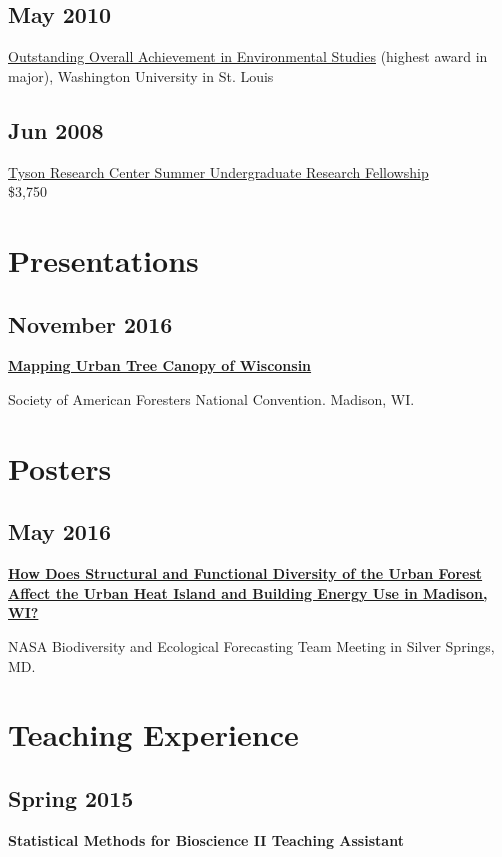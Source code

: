 \documentclass{article}
\begin{document}
\subsection*{May  2010}
\label{sec:orgb18f05c}
\href{http://enst.wustl.edu/program/awards}{Outstanding Overall Achievement in Environmental Studies} (highest
award in major), Washington University in St. Louis

\subsection*{Jun 2008}
\label{sec:org7071e04}
\href{http://tyson.wustl.edu/teaching-ugrad.php}{Tyson Research Center Summer Undergraduate Research Fellowship} \\
 \$3,750

\section*{Presentations}
\label{sec:org1988da5}
\subsection*{November 2016}
\label{sec:org512fd0d}
\textbf{\href{http://pages.stat.wisc.edu/\~erker/Presentations/SAF\_20161105/saf\_presentation.html}{Mapping Urban Tree Canopy of Wisconsin}}

Society of American Foresters National Convention. Madison, WI.
\section*{Posters}
\label{sec:org1da8baf}
\subsection*{May 2016}
\label{sec:org2bfb711}
\textbf{\href{http://pages.stat.wisc.edu/\~erker/Posters/NASA\_poster\_2016.png}{How Does Structural and Functional Diversity of the Urban Forest
Affect the Urban Heat Island and Building Energy Use in Madison, WI?}}

NASA Biodiversity and Ecological Forecasting Team Meeting in Silver Springs, MD.
\section*{Teaching Experience}
\label{sec:org8fc4ad2}
\subsection*{Spring 2015}
\label{sec:org43c7df4}
\textbf{Statistical Methods for Bioscience II Teaching Assistant}
\end{document}
